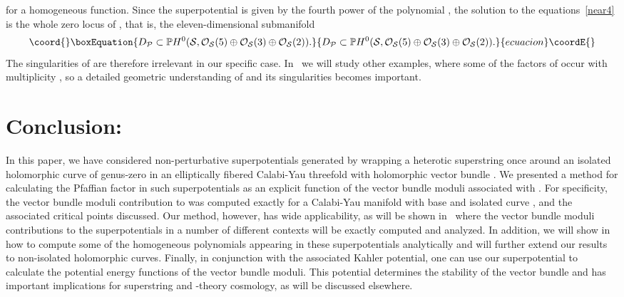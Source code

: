 \documentclass[a4paper,12pt]{article}
\numberwithin{equation}{section}
\theoremstyle{plain}
\begin{document}
for a homogeneous function. Since the superpotential \coordHE{} is given
by the fourth power of the polynomial \coordHE{},
the solution to
the equations~\eqref{near4} is the whole zero locus of \coordHE{}, that is,
the eleven-dimensional submanifold
%
\begin{equation}\coord{}\boxEquation{
D_{\cal P}
\subset {\mathbb P}H^{0}
({\cal S}, {\cal O}_{{\cal S}}(5) \oplus {\cal O}_{{\cal S}}(3) \oplus
{\cal O}_{{\cal S}}(2)).
\label{final1}
}{
D_{\cal P}
\subset {\mathbb P}H^{0}
({\cal S}, {\cal O}_{{\cal S}}(5) \oplus {\cal O}_{{\cal S}}(3) \oplus
{\cal O}_{{\cal S}}(2)).
}{ecuacion}\coordE{}\end{equation}
%
The singularities of \coordHE{} are therefore irrelevant in our specific case.
In~\cite{BDOnew} we will study other examples, where some of the factors of
\coordHE{} occur with multiplicity \coordHE{}, so a detailed geometric understanding of
\coordHE{} and its singularities becomes important.



\section{Conclusion:}


In this paper, we have considered non-perturbative superpotentials \coordHE{}
generated by wrapping a heterotic superstring once around an isolated
holomorphic curve \coordHE{} of genus-zero in an elliptically fibered Calabi-Yau
threefold with holomorphic vector bundle \coordHE{}. We presented a method for
calculating the Pfaffian factor in such superpotentials as an explicit
function of the vector bundle moduli associated with \coordHE{}. For
specificity, the vector bundle moduli contribution to \coordHE{} was computed
exactly
for a Calabi-Yau manifold with base \coordHE{} and isolated curve
\coordHE{}, and the associated critical points discussed. Our method,
however, has wide applicability, as will be shown in~\cite{BDOnew} where
the
vector bundle moduli contributions to the superpotentials in a number of
different contexts will be exactly computed and analyzed. In addition, we
will
show in~\cite{BDOnew} how to compute some of the homogeneous polynomials
appearing in these superpotentials analytically and will further extend
our
results to non-isolated holomorphic curves. Finally, in conjunction with
the
associated Kahler potential, one can use our superpotential to calculate
the potential energy functions of the vector bundle moduli. This potential
determines the stability of the vector bundle and has important
implications
for superstring and \coordHE{}-theory cosmology, as will be discussed elsewhere.
\end{document}
